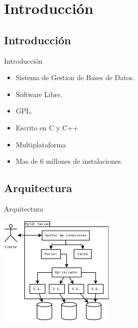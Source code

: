 \section{Introducción}

\subsection{Introducción}
\begin{frame}{Introducción}
  \begin{itemize}
    \item Sistema de Gestion de Bases de Datos.
    \item Software Libre.
    \item GPL.
    \item Escrito en C y C++
    \item Multiplataforma
    \item Mas de 6 millones de instalaciones.
  \end{itemize}
\end{frame}

\subsection{Arquitectura}
\begin{frame}{Arquitectura}
  \begin{center}
    \includegraphics[height=5.5cm]{imgs/arch.png}
  \end{center}
\end{frame}
